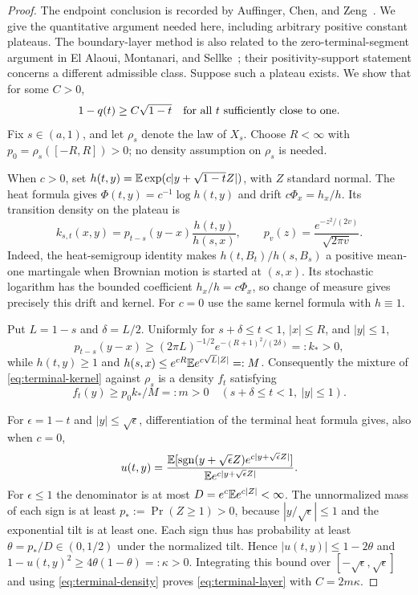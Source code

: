 \begin{proof}
The endpoint conclusion is recorded by Auffinger, Chen, and
Zeng~\cite[Remark~7]{ACZ2017}. We give the quantitative argument
needed here, including arbitrary positive constant plateaus.
The boundary-layer method is also related to the zero-terminal-segment
argument in El Alaoui, Montanari, and
Sellke~\cite[Lemma~6.12 and the proof of Theorem~5 in the cited preprint]{EAMS2021};
their positivity-support statement concerns a different admissible class.
Suppose such a plateau exists.  We show that for some $C>0$,
\begin{equation}
 1-q(t)\geq C\sqrt{1-t}
 \quad\hbox{for all $t$ sufficiently close to one}.
 \label{eq:terminal-layer}
\end{equation}
Fix $s\in(a,1)$, and let $\rho_s$ denote the law of $X_s$.
Choose $R<\infty$ with $p_0=\rho_s([-R,R])>0$; no density
assumption on $\rho_s$ is needed.

When $c>0$, set
$h(t,y)=\mathbb E\exp(c|y+\sqrt{1-t}Z|)$, with $Z$ standard normal.
The heat formula gives $\Phi(t,y)=c^{-1}\log h(t,y)$ and
drift $c\Phi_x=h_x/h$.  Its transition density on the plateau is
\begin{equation}
 k_{s,t}(x,y)=p_{t-s}(y-x)\frac{h(t,y)}{h(s,x)},
 \qquad
 p_v(z)=\frac{e^{-z^2/(2v)}}{\sqrt{2\pi v}}.
 \label{eq:terminal-kernel}
\end{equation}
Indeed, the heat-semigroup identity makes
$h(t,B_t)/h(s,B_s)$ a positive mean-one martingale when
Brownian motion is started at $(s,x)$.  Its stochastic logarithm
has the bounded coefficient $h_x/h=c\Phi_x$, so change of
measure gives precisely this drift and kernel.
For $c=0$ use the same kernel formula with $h\equiv1$.

Put $L=1-s$ and $\delta=L/2$.  Uniformly for
$s+\delta\leq t<1$, $|x|\leq R$, and $|y|\leq1$,
\[
 p_{t-s}(y-x)\geq
 (2\pi L)^{-1/2}e^{-(R+1)^2/(2\delta)}=:k_*>0,
\]
while $h(t,y)\geq1$ and
$h(s,x)\leq e^{cR}\mathbb E e^{c\sqrt L|Z|}=:M$.
Consequently the mixture of \eqref{eq:terminal-kernel} against
$\rho_s$ is a density $f_t$ satisfying
\begin{equation}
 f_t(y)\geq p_0k_*/M=:m>0
 \quad (s+\delta\leq t<1,\ |y|\leq1).
 \label{eq:terminal-density}
\end{equation}

For $\epsilon=1-t$ and $|y|\leq\sqrt\epsilon$,
differentiation of the terminal heat formula gives, also when
$c=0$,
\[
 u(t,y)=
 \frac{\mathbb E[\operatorname{sgn}(y+\sqrt\epsilon Z)
                      e^{c|y+\sqrt\epsilon Z|}]}
      {\mathbb E e^{c|y+\sqrt\epsilon Z|}}.
\]
For $\epsilon\leq1$ the denominator is at most
$D=e^c\mathbb E e^{c|Z|}<\infty$.  The unnormalized mass of each
sign is at least $p_*:=\Pr(Z\geq1)>0$, because
$|y/\sqrt\epsilon|\leq1$ and the exponential tilt is at least
one.  Each sign thus has probability at least
$\theta=p_*/D\in(0,1/2)$ under the normalized tilt.  Hence
$|u(t,y)|\leq1-2\theta$ and
$1-u(t,y)^2\geq4\theta(1-\theta)=:\kappa>0$.
Integrating this bound over
$[-\sqrt\epsilon,\sqrt\epsilon]$ and using
\eqref{eq:terminal-density} proves
\eqref{eq:terminal-layer} with $C=2m\kappa$.


\end{proof}
